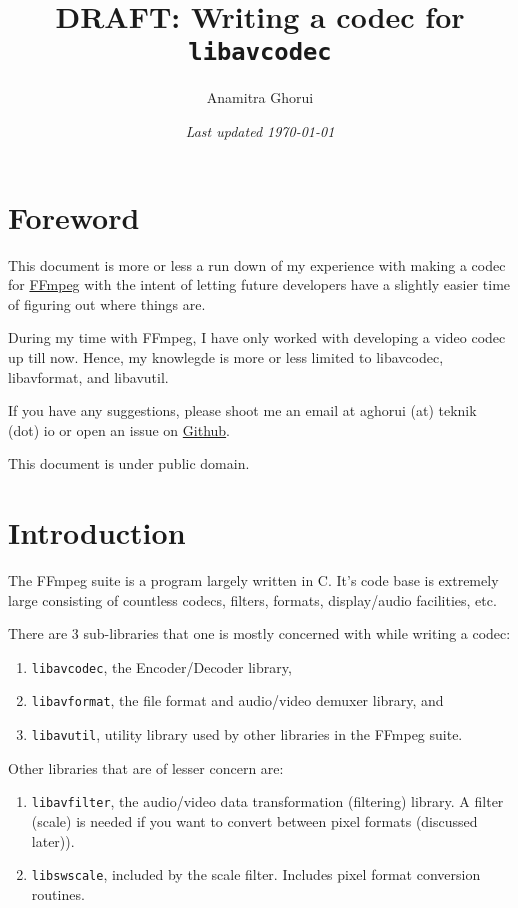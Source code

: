 \documentclass{article}
\begin{document}
\title{DRAFT: Writing a codec for \texttt{libavcodec}}
\author{Anamitra Ghorui}
\date{\emph{Last updated \today}}
\maketitle

\tableofcontents

\section{Foreword}

This document is more or less a run down of my experience with making a codec 
for \href{https://ffmpeg.org}{FFmpeg} with the intent of letting future
developers have a slightly easier time of figuring out where things are.

During my time with FFmpeg, I have only worked with developing a video codec up 
till now. Hence, my knowlegde is more or less limited to libavcodec, 
libavformat, and libavutil.

If you have any suggestions, please shoot me an email at aghorui (at) teknik 
(dot) io or open an issue on 
\href{https://github.com/daujerrine/ffmpeg-doc}{Github}.

This document is under public domain.

\section{Introduction}

The FFmpeg suite is a program largely written in C. It's code base is extremely large consisting of countless codecs, filters, formats, display/audio facilities, etc.

There are 3 sub-libraries that one is mostly concerned with while writing a codec:

\begin{enumerate}
\item \texttt{libavcodec}, the Encoder/Decoder library,
\item \texttt{libavformat}, the file format and audio/video demuxer library, and
\item \texttt{libavutil}, utility library used by other libraries in the FFmpeg 
      suite.
\end{enumerate}

Other libraries that are of lesser concern are:

\begin{enumerate}
\item \texttt{libavfilter}, the audio/video data transformation (filtering) 
      library. A filter (scale) is needed if you want to convert between pixel 
      formats (discussed later)).
\item \texttt{libswscale}, included by the scale filter. Includes pixel format 
      conversion routines.
\end{enumerate}
\end{document}

